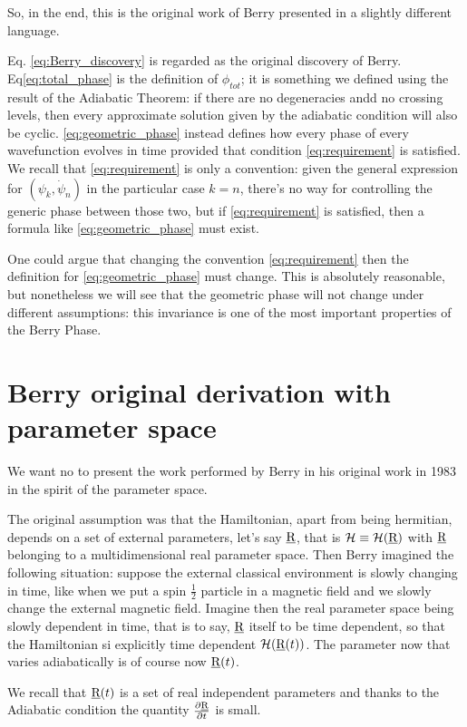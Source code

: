 So, in the end, this is the original work of Berry presented in a slightly different language.
\begin{rem}
	Eq. \eqref{eq:Berry_discovery} is regarded as the original discovery of Berry. Eq\eqref{eq:total_phase} is the definition of $ \phi_{tot} $; it is something we defined using the result of the Adiabatic Theorem: if there are no degeneracies andd no crossing levels, then every  approximate solution given by the adiabatic condition will also be cyclic. %
	\eqref{eq:geometric_phase} instead defines how every phase of every wavefunction evolves in time provided that condition \eqref{eq:requirement} is  satisfied. We recall that \eqref{eq:requirement} is only a convention: given the general expression for $ (\psi_k,\dot{\psi}_{n}) $ in the particular case $ k=n $, there's no way for controlling the generic phase between those two, but if \eqref{eq:requirement} is satisfied, then a formula like \eqref{eq:geometric_phase} must exist. 
\end{rem}
\begin{rem}
	One could argue that changing the convention \eqref{eq:requirement} then the definition for \eqref{eq:geometric_phase} must change. This is absolutely reasonable, but nonetheless we will see that the geometric phase will not change under different assumptions: this invariance is one of the most important properties of the Berry Phase. 
\end{rem}

\section{Berry original derivation with parameter space}
We want no to present the work performed by Berry in his original work in 1983 in the spirit of the parameter space.

The original assumption was that the Hamiltonian, apart from being hermitian, depends on a set of external parameters, let's say $ \underline{\textrm{R}} $, that is $ \mathcal{H}\equiv\mathcal{H}(\underline{\textrm{R}}) $ with $ \underline{\textrm{R}} $ belonging to a multidimensional real parameter space. Then Berry imagined the following situation: suppose the external classical environment is slowly changing in time, like when we put a spin $ \frac{1}{2} $ particle in a magnetic field and we slowly change the external magnetic field. Imagine then the real parameter space being slowly dependent in time, that is to say, $ \underline{\textrm{R}} $ itself to be time dependent, so that the Hamiltonian si explicitly time dependent $ \mathcal{H}(\underline{\textrm{R}}(t)) $. The parameter now that varies adiabatically is of course now $ \underline{\textrm{R}}(t) $.
\begin{rem}
	We recall that $ \underline{\textrm{R}}(t) $ is a set of real independent parameters and thanks to the Adiabatic condition the quantity $ \frac{\partial \underline{\textrm{R}}}{\partial t} $ is small.
\end{rem}

